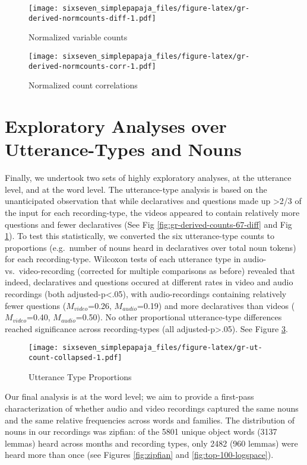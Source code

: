 \documentclass[floatsintext,man]{apa6}
\theoremstyle{definition}
\theoremstyle{definition}
\theoremstyle{definition}
\theoremstyle{remark}
\begin{document}
\begin{figure}
\centering
\texttt{[image: sixseven\_simplepapaja\_files/figure-latex/gr-derived-normcounts-diff-1.pdf]}
\caption{\label{fig:gr-derived-normcounts-diff}Normalized variable counts}
\end{figure}

\begin{figure}
\centering
\texttt{[image: sixseven\_simplepapaja\_files/figure-latex/gr-derived-normcounts-corr-1.pdf]}
\caption{\label{fig:gr-derived-normcounts-corr}Normalized count
correlations}
\end{figure}

\section{Exploratory Analyses over Utterance-Types and
Nouns}\label{exploratory-analyses-over-utterance-types-and-nouns}

Finally, we undertook two sets of highly exploratory analyses, at the
utterance level, and at the word level. The utterance-type analysis is
based on the unanticipated observation that while declaratives and
questions made up \textgreater{}2/3 of the input for each
recording-type, the videos appeared to contain relatively more questions
and fewer declaratives (See Fig \ref{fig:gr-derived-counts-67-diff} and
Fig \ref{fig:gr-derived-normcounts-diff}). To test this statistically,
we converted the six utterance-type counts to proportions (e.g.~number
of nouns heard in declaratives over total noun tokens) for each
recording-type. Wilcoxon tests of each utterance type in audio-
vs.~video-recording (corrected for multiple comparisons as before)
revealed that indeed, declaratives and questions occured at different
rates in video and audio recordings (both adjusted-p\textless{}.05),
with audio-recordings containing relatively fewer questions
(\(M_{video}\)=0.26, \(M_{audio}\)=0.19) and more declaratives than
videos (\(M_{video}\)=0.40, \(M_{audio}\)=0.50). No other proportional
utterance-type differences reached significance across recording-types
(all adjusted-p\textgreater{}.05). See Figure
\ref{fig:gr-ut-count-collapsed}.

\begin{figure}
\centering
\texttt{[image: sixseven\_simplepapaja\_files/figure-latex/gr-ut-count-collapsed-1.pdf]}
\caption{\label{fig:gr-ut-count-collapsed}Utterance Type Proportions}
\end{figure}

Our final analysis is at the word level; we aim to provide a first-pass
characterization of whether audio and video recordings captured the same
nouns and the same relative frequencies across words and families. The
distribution of nouns in our recordings was zipfian: of the 5801 unique
object words (3137 lemmas) heard across months and recording types, only
2482 (960 lemmas) were heard more than once (see Figures
\ref{fig:zipfian} and \ref{fig:top-100-logspace}).
\end{document}

